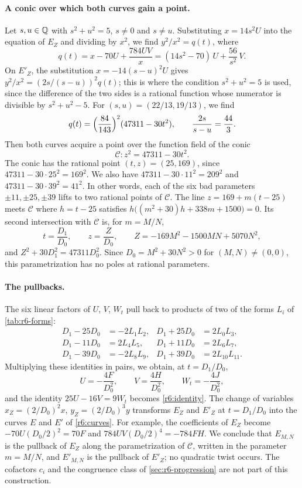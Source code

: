 \paragraph{A conic over which both curves gain a point.} Let $s,u\in\mathbb Q$ with $s^2+u^2=5$, $s\ne0$ and $s\ne u$. Substituting $x=14s^2U$ into the equation of $E_Z$ and dividing by $x^2$, we find $y^2/x^2=q(t)$, where
\[
q(t)=x-70U+\frac{784UV}{x}=(14s^2-70)\,U+\frac{56}{s^2}\,V.
\]
On $E'_Z$, the substitution $x=-14(s-u)^2U$ gives $y^2/x^2=(2s/(s-u))^2q(t)$; this is where the condition $s^2+u^2=5$ is used, since the difference of the two sides is a rational function whose numerator is divisible by $s^2+u^2-5$. For $(s,u)=(22/13,19/13)$, we find
\[
q(t)=\Bigl(\frac{84}{143}\Bigr)^2(47311-30t^2),\qquad \frac{2s}{s-u}=\frac{44}{3}.
\]
Then both curves acquire a point over the function field of the conic
\begin{equation}\label{r6o:conic}
\mathcal C\colon z^2=47311-30t^2.
\end{equation}
The conic has the rational point $(t,z)=(25,169)$, since $47311-30\cdot25^2=169^2$. We also have $47311-30\cdot11^2=209^2$ and $47311-30\cdot39^2=41^2$. In other words, each of the six bad parameters $\pm11,\pm25,\pm39$ lifts to two rational points of $\mathcal C$. The line $z=169+m(t-25)$ meets $\mathcal C$ where $h=t-25$ satisfies $h\bigl((m^2+30)h+338m+1500\bigr)=0$. Its second intersection with $\mathcal C$ is, for $m=M/N$,
\[
t=\frac{D_1}{D_0},\qquad z=\frac{Z}{D_0},\qquad Z=-169M^2-1500MN+5070N^2,
\]
and $Z^2+30D_1^2=47311D_0^2$. Since $D_0=M^2+30N^2>0$ for $(M,N)\ne(0,0)$, this parametrization has no poles at rational parameters.

\paragraph{The pullbacks.} The six linear factors of $U$, $V$, $W_t$ pull back to products of two of the forms $L_i$ of \cref{tab:r6-forms}:
\begin{equation}\label{r6o:pullbacks}
\begin{aligned}
D_1-25D_0&=-2L_1L_2, & D_1+25D_0&=2L_0L_3,\\
D_1-11D_0&=2L_4L_5, & D_1+11D_0&=2L_6L_7,\\
D_1-39D_0&=-2L_8L_9, & D_1+39D_0&=2L_{10}L_{11}.
\end{aligned}
\end{equation}
Multiplying these identities in pairs, we obtain, at $t=D_1/D_0$,
\[
U=-\frac{4F}{D_0^2},\qquad V=\frac{4H}{D_0^2},\qquad W_t=-\frac{4J}{D_0^2},
\]
and the identity $25U-16V=9W_t$ becomes \eqref{r6:identity}. The change of variables $x_Z=(2/D_0)^2x$, $y_Z=(2/D_0)^3y$ transforms $E_Z$ and $E'_Z$ at $t=D_1/D_0$ into the curves $E$ and $E'$ of \eqref{r6:curves}. For example, the coefficients of $E_Z$ become $-70U(D_0/2)^2=70F$ and $784UV(D_0/2)^4=-784FH$. We conclude that $E_{M,N}$ is the pullback of $E_Z$ along the parametrization of $\mathcal C$, written in the parameter $m=M/N$, and $E'_{M,N}$ is the pullback of $E'_Z$; no quadratic twist occurs. The cofactors $c_i$ and the congruence class of \cref{sec:r6-progression} are not part of this construction.

